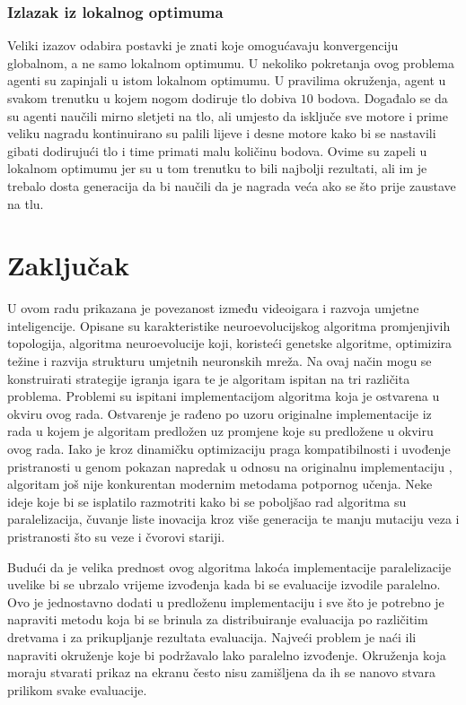 \documentclass[times, utf8, diplomski, numeric]{fer}
\begin{document}
\subsection{Izlazak iz lokalnog optimuma}
Veliki izazov odabira postavki je znati koje omogućavaju konvergenciju globalnom, a ne samo lokalnom optimumu. U nekoliko pokretanja ovog problema agenti su zapinjali u istom lokalnom optimumu. U pravilima okruženja, agent u svakom trenutku u kojem nogom dodiruje tlo dobiva $10$ bodova. Događalo se da su agenti naučili mirno sletjeti na tlo, ali umjesto da isključe sve motore i prime veliku nagradu kontinuirano su palili lijeve i desne motore kako bi se nastavili gibati dodirujući tlo i time primati malu količinu bodova. Ovime su zapeli u lokalnom optimumu jer su u tom trenutku to bili najbolji rezultati, ali im je trebalo dosta generacija da bi naučili da je nagrada veća ako se što prije zaustave na tlu.

\chapter{Zaključak}
U ovom radu prikazana je povezanost između videoigara i razvoja umjetne inteligencije. Opisane su karakteristike neuroevolucijskog algoritma promjenjivih topologija, algoritma  neuroevolucije koji, koristeći genetske algoritme, optimizira težine i razvija strukturu umjetnih neuronskih mreža. Na ovaj način mogu se konstruirati strategije igranja igara te je algoritam ispitan na tri različita problema. Problemi su ispitani implementacijom algoritma koja je ostvarena u okviru ovog rada. Ostvarenje je rađeno po uzoru originalne implementacije iz rada u kojem je algoritam predložen \citep{rad5} uz promjene koje su predložene u okviru ovog rada. Iako je kroz dinamičku optimizaciju praga kompatibilnosti i uvođenje pristranosti u genom pokazan napredak u odnosu na originalnu implementaciju \citep{rad5}, algoritam još nije konkurentan modernim metodama potpornog učenja. Neke ideje koje bi se isplatilo razmotriti kako bi se poboljšao rad algoritma su paralelizacija, čuvanje liste inovacija kroz više generacija te manju mutaciju veza i pristranosti što su veze i čvorovi stariji.

Budući da je velika prednost ovog algoritma lakoća implementacije paralelizacije uvelike bi se ubrzalo vrijeme izvođenja kada bi se evaluacije izvodile paralelno. Ovo je jednostavno dodati u predloženu implementaciju i sve što je potrebno je napraviti metodu koja bi se brinula za distribuiranje evaluacija po različitim dretvama i za prikupljanje rezultata evaluacija. Najveći problem je naći ili napraviti okruženje koje bi podržavalo lako paralelno izvođenje. Okruženja koja moraju stvarati prikaz na ekranu često nisu zamišljena da ih se nanovo stvara prilikom svake evaluacije.
\end{document}
